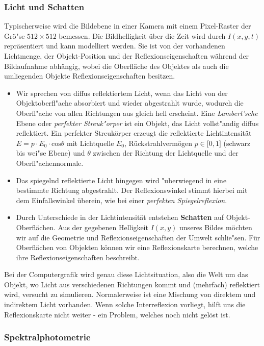 \subsubsection{Licht und Schatten}

Typischerweise wird die Bildebene in einer Kamera mit einem Pixel-Raster der Grö"se $512\times 512$ bemessen. Die Bildhelligkeit über die Zeit wird durch $I(x,y,t)$ repräsentiert und kann modelliert werden. Sie ist von der vorhandenen Lichtmenge, der Objekt-Position und der Reflexionseigenschaften während der Bildaufnahme abhängig, wobei die Oberfläche des Objektes als auch die umliegenden Objekte Reflexionseigenschaften besitzen.
\begin{itemize}
\item
Wir sprechen von diffus reflektiertem Licht, wenn das Licht von der Objektoberfl"ache absorbiert und wieder abgestrahlt wurde, wodurch die Oberfl"ache von allen Richtungen aus gleich hell erscheint. Eine \textit{Lambert'sche} Ebene oder \emph{perfekter Streuk"orper} ist ein Objekt, das Licht vollst"andig diffus reflektiert. Ein perfekter Streukörper erzeugt die reflektierte Lichtintensität
$E = p\cdot E_0\cdot \mathrm{cos}\theta$
mit Lichtquelle $E_0$, Rückstrahlvermögen $p\in\lbrack 0,1\rbrack$ (schwarz bis wei"se Ebene) und $\theta$ zwischen der Richtung der Lichtquelle und der Oberfl"achennormale.
\item
Das spiegelnd reflektierte Licht hingegen wird "uberwiegend in eine bestimmte Richtung abgestrahlt. Der Reflexionswinkel stimmt hierbei mit dem Einfallswinkel überein, wie bei einer \textit{perfekten Spiegelreflexion}.
\item
Durch Unterschiede in der Lichtintensität entstehen \textbf{Schatten} auf Objekt-Oberflächen. Aus der gegebenen Helligkeit $I(x,y)$ unseres Bildes möchten wir auf die Geometrie und Reflexionseigenschaften der Umwelt schlie"sen. Für Oberflächen von Objekten können wir eine Reflexionskarte berechnen, welche ihre Reflexionseigenschaften beschreibt.
\end{itemize}
Bei der Computergrafik wird genau diese Lichtsituation, also die Welt um das Objekt, wo Licht aus verschiedenen Richtungen kommt und (mehrfach) reflektiert wird, versucht zu simulieren.
Normalerweise ist eine Mischung von direktem und indirektem Licht vorhanden. Wenn solche Interreflexion vorliegt, hilft uns die Reflexionskarte nicht weiter - ein Problem, welches noch nicht gelöst ist.

\subsubsection{Spektralphotometrie}

